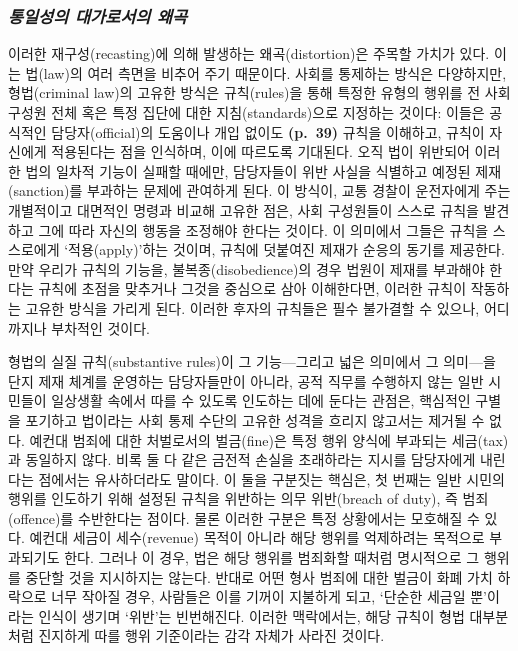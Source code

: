 \documentclass[12pt, oneside]{book}  %
\begin{document}
\subsubsection{\texorpdfstring{\emph{통일성의 대가로서의
왜곡}}{통일성의 대가로서의 왜곡}}\label{uxd1b5uxc77cuxc131uxc758-uxb300uxac00uxb85cuxc11cuxc758-uxc65cuxace1}

이러한 재구성(recasting)에 의해 발생하는 왜곡(distortion)은 주목할
가치가 있다. 이는 법(law)의 여러 측면을 비추어 주기 때문이다. 사회를
통제하는 방식은 다양하지만, 형법(criminal law)의 고유한 방식은
규칙(rules)을 통해 특정한 유형의 행위를 전 사회 구성원 전체 혹은 특정
집단에 대한 지침(standards)으로 지정하는 것이다: 이들은 공식적인
담당자(official)의 도움이나 개입 없이도 \textbf{(p.~39)} 규칙을
이해하고, 규칙이 자신에게 적용된다는 점을 인식하며, 이에 따르도록
기대된다. 오직 법이 위반되어 이러한 법의 일차적 기능이 실패할 때에만,
담당자들이 위반 사실을 식별하고 예정된 제재(sanction)를 부과하는 문제에
관여하게 된다. 이 방식이, 교통 경찰이 운전자에게 주는 개별적이고
대면적인 명령과 비교해 고유한 점은, 사회 구성원들이 스스로 규칙을
발견하고 그에 따라 자신의 행동을 조정해야 한다는 것이다. 이 의미에서
그들은 규칙을 스스로에게 `적용(apply)'하는 것이며, 규칙에 덧붙여진
제재가 순응의 동기를 제공한다. 만약 우리가 규칙의 기능을,
불복종(disobedience)의 경우 법원이 제재를 부과해야 한다는 규칙에 초점을
맞추거나 그것을 중심으로 삼아 이해한다면, 이러한 규칙이 작동하는 고유한
방식을 가리게 된다. 이러한 후자의 규칙들은 필수 불가결할 수 있으나,
어디까지나 부차적인 것이다.

형법의 실질 규칙(substantive rules)이 그 기능---그리고 넓은 의미에서 그
의미---을 단지 제재 체계를 운영하는 담당자들만이 아니라, 공적 직무를
수행하지 않는 일반 시민들이 일상생활 속에서 따를 수 있도록 인도하는 데에
둔다는 관점은, 핵심적인 구별을 포기하고 법이라는 사회 통제 수단의 고유한
성격을 흐리지 않고서는 제거될 수 없다. 예컨대 범죄에 대한 처벌로서의
벌금(fine)은 특정 행위 양식에 부과되는 세금(tax)과 동일하지 않다. 비록
둘 다 같은 금전적 손실을 초래하라는 지시를 담당자에게 내린다는 점에서는
유사하더라도 말이다. 이 둘을 구분짓는 핵심은, 첫 번째는 일반 시민의
행위를 인도하기 위해 설정된 규칙을 위반하는 의무 위반(breach of duty),
즉 범죄(offence)를 수반한다는 점이다. 물론 이러한 구분은 특정 상황에서는
모호해질 수 있다. 예컨대 세금이 세수(revenue) 목적이 아니라 해당 행위를
억제하려는 목적으로 부과되기도 한다. 그러나 이 경우, 법은 해당 행위를
범죄화할 때처럼 명시적으로 그 행위를 중단할 것을 지시하지는 않는다.
반대로 어떤 형사 범죄에 대한 벌금이 화폐 가치 하락으로 너무 작아질 경우,
사람들은 이를 기꺼이 지불하게 되고, `단순한 세금일 뿐'이라는 인식이
생기며 `위반'는 빈번해진다. 이러한 맥락에서는, 해당 규칙이 형법
대부분처럼 진지하게 따를 행위 기준이라는 감각 자체가 사라진 것이다.
\end{document}
